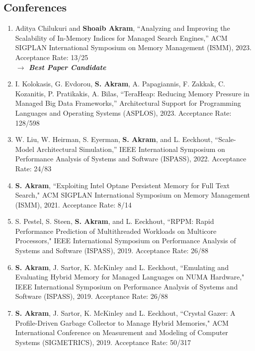 \documentclass[singlecolumn,singlespace,11pt]{article}
\begin{document}
\subsection*{Conferences}
\begin{enumerate}

\item
Aditya Chilukuri and \textbf{Shoaib Akram}, ``Analyzing and Improving the Scalability of In-Memory Indices for Managed Search Engines,'' ACM SIGPLAN International Symposium on Memory Management (ISMM), 2023. {\color{blue} Acceptance Rate: 13/25}
\\
{\color{BrickRed} \textbf{$\longrightarrow$ \emph{Best Paper Candidate}}}

\item 
I. Kolokasis, G. Evdorou, \textbf{S. Akram}, A. Papagiannis, F. Zakkak, C. Kozanitis, P. Pratikakis, A. Bilas, ``TeraHeap: Reducing Memory Pressure in Managed Big Data Frameworks,'' Architectural Support for Programming Languages and Operating Systems (ASPLOS), 2023. {\color{blue} Acceptance Rate: 128/598}

\item
W. Liu, W. Heirman, S. Eyerman, \textbf{S. Akram}, and L. Eeckhout,
``Scale-Model Architectural Simulation,'' IEEE International Symposium on
Performance Analysis of Systems and Software (ISPASS), 2022. {\color{blue} Acceptance Rate: 24/83}

\item
\textbf{S. Akram}, ``Exploiting Intel Optane Persistent Memory for Full Text Search," ACM SIGPLAN International Symposium on Memory Management (ISMM), 2021. {\color{blue} Acceptance Rate: 8/14}

\item
S. Pestel, S. Steen, \textbf{S. Akram}, and L. Eeckhout, ``RPPM: Rapid Performance Prediction of Multithreaded Workloads on Multicore Processors," IEEE International Symposium on Performance Analysis of Systems and Software (ISPASS), 2019. {\color{blue} Acceptance Rate: 26/88}

\item
\textbf{S. Akram}, J. Sartor, K. McKinley and L. Eeckhout, ``Emulating and Evaluating Hybrid Memory for Managed Languages on NUMA Hardware," IEEE International Symposium on Performance Analysis of Systems and Software (ISPASS), 2019. {\color{blue} Acceptance Rate: 26/88}

\item 
\textbf{S. Akram}, J. Sartor, K. McKinley and L. Eeckhout, ``Crystal Gazer: A Profile-Driven Garbage 
Collector to Manage Hybrid Memories," ACM International Conference on Measurement and Modeling of Computer Systems
(SIGMETRICS), 2019. {\color{blue} Acceptance Rate: 50/317}


\end{enumerate}
\end{document}
